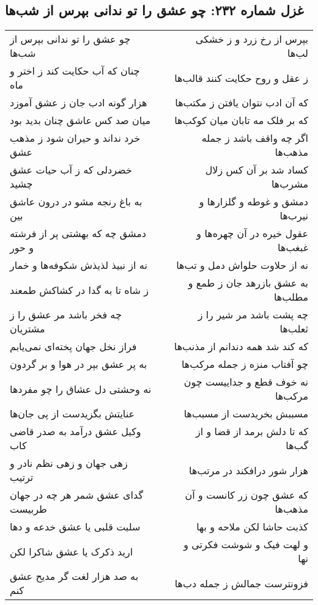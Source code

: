 \begin{center}
\section*{غزل شماره ۲۳۲: چو عشق را تو ندانی بپرس از شب‌ها}
\label{sec:0232}
\begin{longtable}{l p{0.5cm} r}
چو عشق را تو ندانی بپرس از شب‌ها
&&
بپرس از رخ زرد و ز خشکی لب‌ها
\\
چنان که آب حکایت کند ز اختر و ماه
&&
ز عقل و روح حکایت کنند قالب‌ها
\\
هزار گونه ادب جان ز عشق آموزد
&&
که آن ادب نتوان یافتن ز مکتب‌ها
\\
میان صد کس عاشق چنان بدید بود
&&
که بر فلک مه تابان میان کوکب‌ها
\\
خرد نداند و حیران شود ز مذهب عشق
&&
اگر چه واقف باشد ز جمله مذهب‌ها
\\
خضردلی که ز آب حیات عشق چشید
&&
کساد شد بر آن کس زلال مشرب‌ها
\\
به باغ رنجه مشو در درون عاشق بین
&&
دمشق و غوطه و گلزارها و نیرب‌ها
\\
دمشق چه که بهشتی پر از فرشته و حور
&&
عقول خیره در آن چهره‌ها و غبغب‌ها
\\
نه از نبیذ لذیذش شکوفه‌ها و خمار
&&
نه از حلاوت حلواش دمل و تب‌ها
\\
ز شاه تا به گدا در کشاکش طمعند
&&
به عشق بازرهد جان ز طمع و مطلب‌ها
\\
چه فخر باشد مر عشق را ز مشتریان
&&
چه پشت باشد مر شیر را ز ثعلب‌ها
\\
فراز نخل جهان پخته‌ای نمی‌یابم
&&
که کند شد همه دندانم از مذنب‌ها
\\
به پر عشق بپر در هوا و بر گردون
&&
چو آفتاب منزه ز جمله مرکب‌ها
\\
نه وحشتی دل عشاق را چو مفردها
&&
نه خوف قطع و جداییست چون مرکب‌ها
\\
عنایتش بگزیدست از پی جان‌ها
&&
مسببش بخریدست از مسبب‌ها
\\
وکیل عشق درآمد به صدر قاضی کاب
&&
که تا دلش برمد از قضا و از گب‌ها
\\
زهی جهان و زهی نظم نادر و ترتیب
&&
هزار شور درافکند در مرتب‌ها
\\
گدای عشق شمر هر چه در جهان طربیست
&&
که عشق چون زر کانست و آن مذهب‌ها
\\
سلبت قلبی یا عشق خدعه و دها
&&
کذبت حاشا لکن ملاحه و بها
\\
ارید ذکرک یا عشق شاکرا لکن
&&
و لهت فیک و شوشت فکرتی و نها
\\
به صد هزار لغت گر مدیح عشق کنم
&&
فزونترست جمالش ز جمله دب‌ها
\\
\end{longtable}
\end{center}
